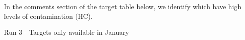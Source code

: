 \documentclass[11pt]{article}
\begin{document}
In the comments section of the target table below, we identify which have high levels of contamination (HC).

\begin{configuration}
\grating{}
\order{}
\crossdisperser{}
\slit{}
\multislit{}
\wstart{}
\wend{}
\cable{}
\corrector{}
\collimator{}
\adc{}
\end{configuration}
\specialrequest    %
\begin{targettable}{Run 3 - Targets only available in January}
\magnitude{}
\obscomment{}      %

\magnitude{}
\obscomment{}      %

\magnitude{}
\obscomment{}      %

\magnitude{}
\obscomment{}      %


\end{targettable}
\end{document}
